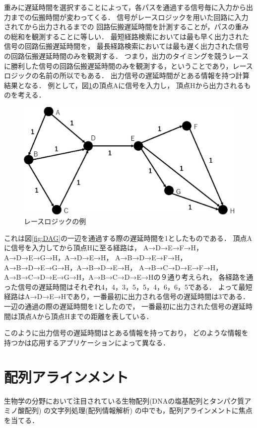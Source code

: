 重みに遅延時間を選択することによって，各パスを通過する信号毎に入力から出力までの伝搬時間が変わってくる．
信号がレースロジックを用いた回路に入力されてから出力されるまでの
回路伝搬遅延時間を計測することが，パスの重みの総和を観測することに等しい．
最短経路検索においては最も早く出力された信号の回路伝搬遅延時間を，
最長経路検索においては最も遅く出力された信号の回路伝搬遅延時間のみを観測する．
つまり，出力のタイミングを競うレースに勝利した信号の回路伝搬遅延時間のみを観測する，ということであり，レースロジックの名前の所以でもある．
出力信号の遅延時間がとある情報を持つ計算結果となる．
例として，図\ref{fig:DAG1}の頂点Aに信号を入力し，
頂点Hから出力されるものを考える．
\begin{figure}[t!]
\begin{center}
\includegraphics[keepaspectratio,scale=0.5]{fig/2/DAG1.eps}
\caption{レースロジックの例}
\label{fig:DAG1}
\end{center}
\end{figure}
これは図\ref{fig:DAG}の一辺を通過する際の遅延時間を1としたものである．
頂点Aに信号を入力してから頂点Hに至る経路は，
A→D→E→F→H，A→D→E→G→H，A→D→E→H，
A→B→D→E→F→H，A→B→D→E→G→H，A→B→D→E→H，
A→B→C→D→E→F→H，A→B→C→D→E→G→H，A→B→C→D→E→Hの９通り考えられ，
各経路を通った信号の遅延時間はそれぞれ4，4，3，5，5，4，6，6，5である．
よって最短経路はA→D→E→Hであり，一番最初に出力される信号の遅延時間は3である．
一辺の通過の際の遅延時間を1としたので，
一番最初に出力された信号の遅延時間は頂点Aから頂点Hまでの距離を表している．

このように出力信号の遅延時間はとある情報を持っており，
どのような情報を持つかは応用するアプリケーションによって異なる．

\section{配列アラインメント}
生物学の分野において注目されている生物配列(DNAの塩基配列とタンパク質アミノ酸配列) の文字列処理(配列情報解析)
\cite{浅井潔2000配列情報と確立モデル,後藤修1998マルチプルアラインメントは生体高分子情報の交差点}
の中でも，配列アラインメントに焦点を当てる．

